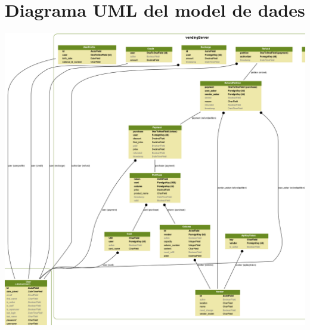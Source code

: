 \chapter{Diagrama UML del model de dades}\label{app:uml}
\newpage\null\thispagestyle{empty}\newpage
\includegraphics[width=1\textwidth]{images/uml}